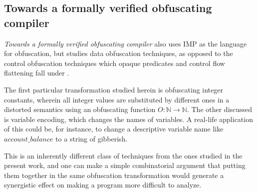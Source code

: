 \documentclass[compsoc,conference,a4paper,10pt,times]{IEEEtran}
\begin{document}
\subsection*{Towards a formally verified obfuscating compiler}
\par \emph{Towards a formally verified obfuscating compiler} \cite{Blazy1} also uses IMP as the language for obfuscation, but studies data obfuscation techniques, as opposed to the control obfuscation techniques which opaque predicates and control flow flattening fall under \cite{CollbergTax}.
\par The first particular transformation studied herein is obfuscating integer constants, wherein all integer values are substituted by different ones in a distorted semantics using an obfuscating function $O: \mathbb{N} \to \mathbb{N}$.  The other discussed is variable encoding, which changes the names of variables.  A real-life application of this could be, for instance, to change a descriptive variable name like $account\_balance$ to a string of gibberish.
\par This is an inherently different class of techniques from the ones studied in the present work, and one can make a simple combinatorial argument that putting them together in the same obfuscation transformation would generate a synergistic effect on making a program more difficult to analyze.
\end{document}
